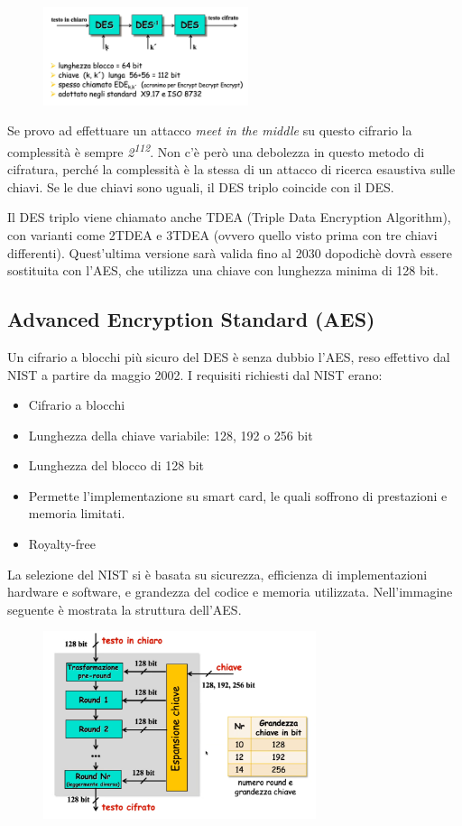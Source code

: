 \begin{figure}[htb!]
    \centering
    \includegraphics[width=6cm]{./Images/cap1/1.16.png}
\end{figure} 

Se provo ad effettuare un attacco \textit{meet in the middle} su questo cifrario la complessità è sempre \textit{2\textsuperscript{112}}. Non c'è però una debolezza in questo metodo di cifratura, perché la complessità è la stessa di un attacco di ricerca esaustiva sulle chiavi. Se le due chiavi sono uguali, il DES triplo coincide con il DES.

Il DES triplo viene chiamato anche TDEA (Triple Data Encryption Algorithm), con varianti come 2TDEA e 3TDEA (ovvero quello visto prima con tre chiavi differenti). Quest'ultima versione sarà valida fino al 2030 dopodichè dovrà essere sostituita con l'AES, che utilizza una chiave con lunghezza minima di 128 bit.

\subsection{Advanced Encryption Standard (AES)}

Un cifrario a blocchi più sicuro del DES è senza dubbio l'AES, reso effettivo dal NIST a partire da maggio 2002. I requisiti richiesti dal NIST erano:
\begin{itemize}
    \item Cifrario a blocchi
    \item Lunghezza della chiave variabile: 128, 192 o 256 bit
    \item Lunghezza del blocco di 128 bit
    \item Permette l'implementazione su smart card, le quali soffrono di prestazioni e memoria limitati.
    \item Royalty-free 
\end{itemize}

La selezione del NIST si è basata su sicurezza, efficienza di implementazioni hardware e software, e grandezza del codice e memoria utilizzata. Nell'immagine seguente è mostrata la struttura dell'AES.

\begin{figure}[htb!]
    \centering
    \includegraphics[width=8cm]{./Images/cap1/1.17.png}
\end{figure} 

